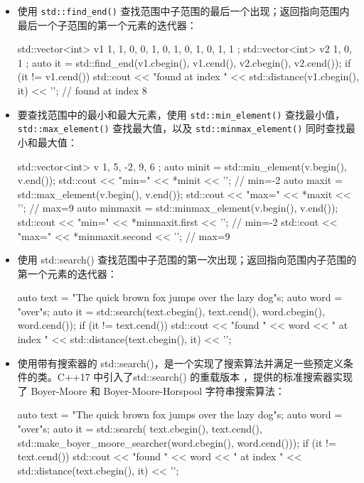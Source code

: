 \begin{itemize}
\item
使用 \verb|std::find_end()| 查找范围中子范围的最后一个出现；返回指向范围内最后一个子范围的第一个元素的迭代器：

\begin{cpp}
std::vector<int> v1{ 1, 1, 0, 0, 1, 0, 1, 0, 1, 0, 1, 1 };
std::vector<int> v2{ 1, 0, 1 };
auto it = std::find_end(v1.cbegin(), v1.cend(),
                        v2.cbegin(), v2.cend());
if (it != v1.cend())
    std::cout << "found at index "
              << std::distance(v1.cbegin(), it) << '\n';
// found at index 8
\end{cpp}

\item
要查找范围中的最小和最大元素，使用 \verb|std::min_element()| 查找最小值，\verb|std::max_element()| 查找最大值，以及 \verb|std::minmax_element()| 同时查找最小和最大值：

\begin{cpp}
std::vector<int> v{ 1, 5, -2, 9, 6 };
auto minit = std::min_element(v.begin(), v.end());
std::cout << "min=" << *minit << '\n';           // min=-2
auto maxit = std::max_element(v.begin(), v.end());
std::cout << "max=" << *maxit << '\n';           // max=9
auto minmaxit = std::minmax_element(v.begin(), v.end());
std::cout << "min=" << *minmaxit.first << '\n';  // min=-2
std::cout << "max=" << *minmaxit.second << '\n'; // max=9
\end{cpp}

\item
使用 std::search() 查找范围中子范围的第一次出现；返回指向范围内子范围的第一个元素的迭代器：

\begin{cpp}
auto text = "The quick brown fox jumps over the lazy dog"s;
auto word = "over"s;
auto it = std::search(text.cbegin(), text.cend(),
                      word.cbegin(), word.cend());
if (it != text.cend())
    std::cout << "found " << word
              << " at index "
              << std::distance(text.cbegin(), it) << '\n';
\end{cpp}

\item
使用带有搜索器的 std::search()，是一个实现了搜索算法并满足一些预定义条件的类。C++17 中引入了std::search() 的重载版本 ，提供的标准搜索器实现了 Boyer-Moore 和 Boyer-Moore-Horspool 字符串搜索算法：

\begin{cpp}
auto text = "The quick brown fox jumps over the lazy dog"s;
auto word = "over"s;
auto it = std::search(
    text.cbegin(), text.cend(),
    std::make_boyer_moore_searcher(word.cbegin(), word.cend()));
if (it != text.cend())
    std::cout << "found " << word
              << " at index "
              << std::distance(text.cbegin(), it) << '\n';
\end{cpp}


\end{itemize}
